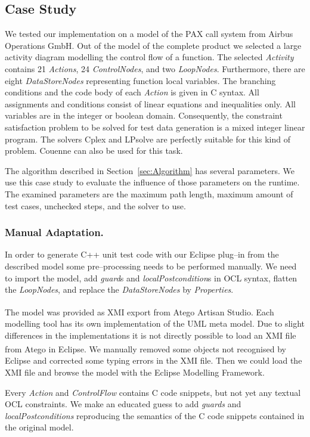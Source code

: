 \documentclass[runningheads,a4paper]{llncs}%
\newcommand{\UMLType}[1]{\textsf{\textit{#1}}} %
\newcommand{\UMLReference}[1]{\textsf{\textit{#1}}} %
\begin{document}
\subsection{Case Study}
\label{sec:CaseStudy}
We tested our implementation on a model of the PAX call system from Airbus
Operations GmbH. Out of the model of the complete product we selected a large
activity diagram modelling the control flow of a function. The selected
\UMLType{Activity} contains 21 \UMLType{Actions}, 24 \UMLType{ControlNodes}, and
two \UMLType{LoopNodes}. Furthermore, there are eight \UMLType{DataStoreNodes}
representing function local variables. The branching conditions and the code
body of each \UMLType{Action} is given in C syntax. All assignments and
conditions consist of linear equations and inequalities only. All variables are
in the integer or boolean domain. Consequently, the constraint satisfaction
problem to be solved for test data generation is a mixed integer linear program.
The solvers Cplex and LPsolve are perfectly suitable for this kind of problem.
Couenne can also be used for this task.

The algorithm described in Section~\ref{sec:Algorithm} has several parameters.
We use this case study to evaluate the influence of those parameters on the
runtime. The examined parameters are the maximum path length, maximum amount of
test cases, unchecked steps, and the solver to use.
\subsubsection{Manual Adaptation.}
In order to generate C++ unit test code with our Eclipse plug--in from the
described model some pre--processing needs to be performed manually. We need to
import the model, add \UMLReference{guard}s and
\UMLReference{localPostcondition}s in OCL syntax, flatten the
\UMLType{LoopNodes}, and replace the \UMLType{DataStoreNodes} by
\UMLType{Properties}.

The model was provided as XMI export from Atego\textsuperscript{\textregistered}
Artisan Studio. Each modelling tool has its own implementation of the UML meta
model. Due to slight differences in the implementations it is not directly
possible to load an XMI file from Atego\textsuperscript{\textregistered} in
Eclipse. We manually removed some objects not recognised by Eclipse and
corrected some typing errors in the XMI file. Then we could load the XMI file
and browse the model with the Eclipse Modelling Framework.

Every \UMLType{Action} and \UMLReference{ControlFlow} contains C code snippets,
but not yet any textual OCL constraints. We make an educated guess to add
\UMLReference{guards} and \UMLReference{localPostconditions} reproducing the
semantics of the C code snippets contained in the original model.
\end{document}
